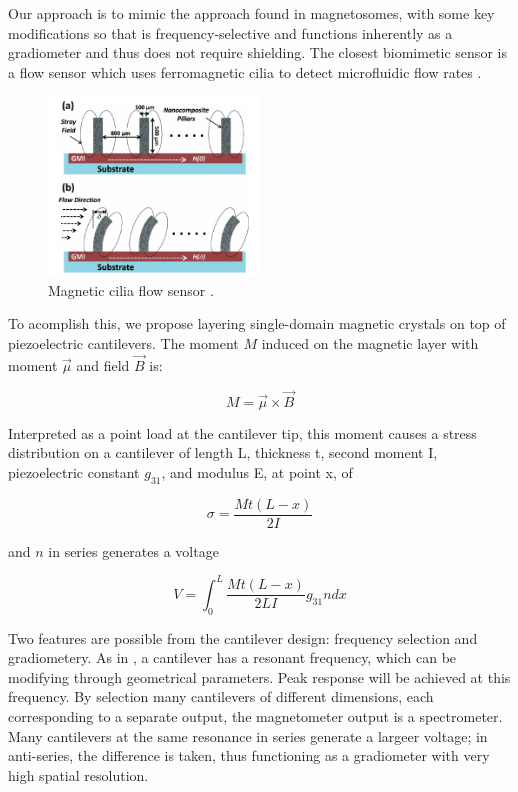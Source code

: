 Our approach is to mimic the approach found in magnetosomes, with some key modifications so that is frequency-selective and functions inherently as a gradiometer and thus does not require shielding. The closest biomimetic sensor is a flow sensor which uses ferromagnetic cilia to detect microfluidic flow rates \cite{alfadhel2014magnetic}.

\begin{figure}[h]
\centering
\includegraphics[width=0.5\textwidth]{cilia}
\caption{Magnetic cilia flow sensor \cite{alfadhel2014magnetic}.}
\label{fig:cilia}
\end{figure}

To acomplish this, we propose layering single-domain magnetic crystals on top of piezoelectric cantilevers. The moment $M$ induced on the magnetic layer with moment $\vec{\mu}$ and field $\vec{B}$ is:


$$  M=\vec{\mu} \times \vec{B} $$

Interpreted as a point load at the cantilever tip, this moment causes a stress distribution on a cantilever of length L, thickness t, second moment I, piezoelectric constant $g_{31}$, and modulus E, at point x, of

$$ \sigma=\frac{Mt(L-x)}{2I} $$

and $n$ in series generates a voltage

$$ V=\int_0^L\frac{Mt(L-x)}{2LI}g_{31}ndx $$

 Two features are possible from the cantilever design: frequency selection and gradiometery. As in \cite{shen2008design}, a cantilever has a resonant frequency, which can be modifying through geometrical parameters. Peak response will be achieved at this frequency. By selection many cantilevers of different dimensions, each corresponding to a separate output, the magnetometer output is a spectrometer. Many cantilevers at the same resonance in series generate a largeer voltage; in anti-series, the difference is taken, thus functioning as a gradiometer with very high spatial resolution. 

